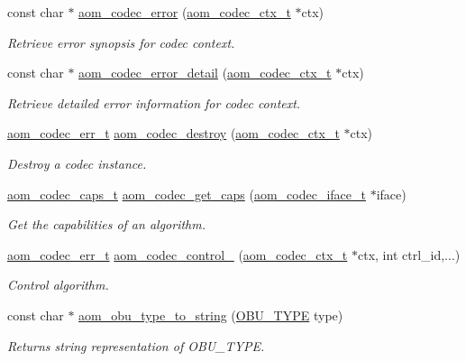 \begin{DoxyCompactItemize}
const char $\ast$ \hyperlink{group__codec_ga50949c0854605c722832bbfb0803f5f4}{aom\+\_\+codec\+\_\+error} (\hyperlink{group__codec_ga9a1d27f9742d9f70783e3c6cb849b5b4}{aom\+\_\+codec\+\_\+ctx\+\_\+t} $\ast$ctx)
\begin{DoxyCompactList}\small\item\em Retrieve error synopsis for codec context. \end{DoxyCompactList}\item 
const char $\ast$ \hyperlink{group__codec_ga43a70562598b485685794a4e9d9d53f7}{aom\+\_\+codec\+\_\+error\+\_\+detail} (\hyperlink{group__codec_ga9a1d27f9742d9f70783e3c6cb849b5b4}{aom\+\_\+codec\+\_\+ctx\+\_\+t} $\ast$ctx)
\begin{DoxyCompactList}\small\item\em Retrieve detailed error information for codec context. \end{DoxyCompactList}\item 
\hyperlink{group__codec_gaaae61e0f8663e6137f1e228757248e7c}{aom\+\_\+codec\+\_\+err\+\_\+t} \hyperlink{group__codec_ga9b60e186f61ba2d6ab2b8069b76a15c5}{aom\+\_\+codec\+\_\+destroy} (\hyperlink{group__codec_ga9a1d27f9742d9f70783e3c6cb849b5b4}{aom\+\_\+codec\+\_\+ctx\+\_\+t} $\ast$ctx)
\begin{DoxyCompactList}\small\item\em Destroy a codec instance. \end{DoxyCompactList}\item 
\hyperlink{group__codec_ga019a4c05cd929e7c50133f6b536eeabf}{aom\+\_\+codec\+\_\+caps\+\_\+t} \hyperlink{group__codec_ga66b1d3c795c3868efc88d73d01439461}{aom\+\_\+codec\+\_\+get\+\_\+caps} (\hyperlink{group__codec_ga4ef55b44c762836d1550e11921bed403}{aom\+\_\+codec\+\_\+iface\+\_\+t} $\ast$iface)
\begin{DoxyCompactList}\small\item\em Get the capabilities of an algorithm. \end{DoxyCompactList}\item 
\hyperlink{group__codec_gaaae61e0f8663e6137f1e228757248e7c}{aom\+\_\+codec\+\_\+err\+\_\+t} \hyperlink{group__codec_ga51eb332a40dcacc39000ab8e0be36b79}{aom\+\_\+codec\+\_\+control\+\_\+} (\hyperlink{group__codec_ga9a1d27f9742d9f70783e3c6cb849b5b4}{aom\+\_\+codec\+\_\+ctx\+\_\+t} $\ast$ctx, int ctrl\+\_\+id,...)
\begin{DoxyCompactList}\small\item\em Control algorithm. \end{DoxyCompactList}\item 
const char $\ast$ \hyperlink{group__codec_gaed56ca94e36f024f20133f253689b64b}{aom\+\_\+obu\+\_\+type\+\_\+to\+\_\+string} (\hyperlink{group__codec_ga8671b36010adf45694a1c0868333c5b6}{O\+B\+U\+\_\+\+T\+Y\+PE} type)
\begin{DoxyCompactList}\small\item\em Returns string representation of O\+B\+U\+\_\+\+T\+Y\+PE. \end{DoxyCompactList}\end{DoxyCompactItemize}


